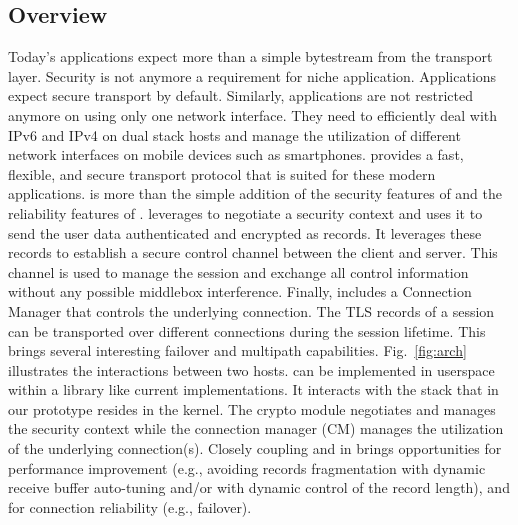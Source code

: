 \subsection{Overview}
Today's applications expect more than a simple bytestream from the transport layer. Security is not anymore a requirement for niche application. Applications expect secure transport by default. Similarly, applications are not restricted anymore on using only one network interface. They need to efficiently deal with IPv6 and IPv4 on dual stack hosts and manage the utilization of different network interfaces on mobile devices such as smartphones. \tcpls provides a fast, flexible, and secure transport protocol that is suited for these modern applications. \tcpls is more than the simple addition of the security features of \tls and the reliability features of \tcp. \tcpls leverages  to negotiate a security context and uses it to send the user data authenticated and encrypted as \tls records. It leverages these records to establish a secure control channel between the client and server. This channel is used to manage the \tcpls session and exchange all control information without any possible middlebox interference. Finally, \tcpls includes a Connection Manager that controls the underlying \tcp connection. The TLS records of a \tcpls session can be transported over different \tcp connections during the session lifetime. This brings several interesting failover and multipath capabilities. Fig.~\ref{fig:arch} illustrates the interactions between two \tcpls hosts. \tcpls can be implemented in userspace within a library like current \tls implementations. It interacts with the \tcp stack that in our prototype resides in the kernel. The crypto module negotiates and manages the security context while the connection manager (CM) manages the utilization of the underlying \tcp connection(s). Closely coupling \tcp and \tls in \tcpls brings opportunities for performance improvement (e.g., avoiding records fragmentation with dynamic receive buffer auto-tuning and/or with dynamic control of the record length), and for connection reliability (e.g., failover).





